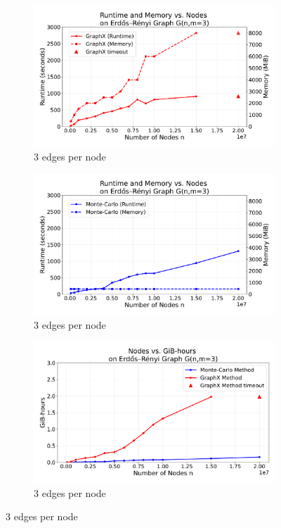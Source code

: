 \begin{figure}[H]
    \centering
    \begin{subfigure}[t]{0.75\linewidth}
        \centering
        \includegraphics[width=\linewidth]{images/plots/ER_3edg/combined_runtime_memory_vs_nodes_3edges_gx.pdf}
        \caption{3 edges per node}
        \label{fig:3run}
    \end{subfigure}
    \begin{subfigure}[t]{0.75\linewidth}
        \centering
        \includegraphics[width=\linewidth]{images/plots/ER_3edg/combined_runtime_memory_vs_nodes_3edges_mc.pdf}
        \caption{3 edges per node}
        \label{fig:3cost}
    \end{subfigure}
    \begin{subfigure}[t]{0.75\linewidth}
        \centering
        \includegraphics[width=\linewidth]{images/plots/ER_3edg/gbhrs_nodes_er_graph_3edges.pdf}
        \caption{3 edges per node}
        \label{fig:3mvm}
    \end{subfigure}
\end{figure}

